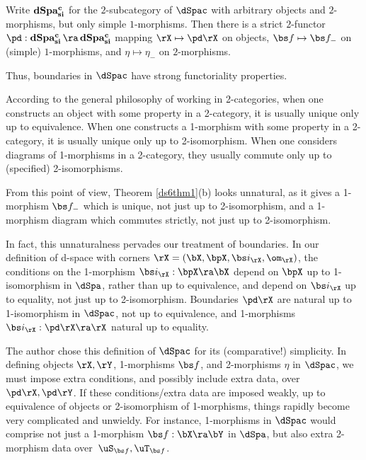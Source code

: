 \documentclass{article}
\begin{document}
\begin{cor} Write $\mathop{\bf dSpa^c_{si}}$ for the
$2$-subcategory of\/ $\dSpac$ with arbitrary objects and\/
$2$-morphisms, but only simple $1$-morphisms. Then there is a
strict\/ $2$-functor\/ $\pd:\mathop{\bf dSpa^c_{si}}\ra \mathop{\bf
dSpa^c_{si}}$ mapping $\rX\mapsto\pd\rX$ on objects, $\bs
f\mapsto\bs f_-$ on (simple)\/ $1$-morphisms, and\/
$\eta\mapsto\eta_-$ on $2$-morphisms.
\label{ds6cor}
\end{cor}

Thus, boundaries in $\dSpac$ have strong functoriality properties.

\begin{rem} According to the general philosophy of working in
2-categories, when one constructs an object with some property in a
2-category, it is usually unique only up to equivalence. When one
constructs a 1-morphism with some property in a 2-category, it is
usually unique only up to 2-isomorphism. When one considers diagrams
of 1-morphisms in a 2-category, they usually commute only up to
(specified) 2-isomorphisms.

From this point of view, Theorem \ref{ds6thm1}(b) looks unnatural,
as it gives a 1-morphism $\bs f_-$ which is unique, not just up to
2-isomorphism, and a 1-morphism diagram  which commutes
strictly, not just up to 2-isomorphism.

In fact, this unnaturalness pervades our treatment of boundaries. In
our definition of d-space with corners $\rX=(\bX,\bpX,\bs
i_\rX,\om_\rX)$, the conditions on the 1-morphism $\bs
i_\rX:\bpX\ra\bX$ depend on $\bpX$ up to 1-isomorphism in $\dSpa$,
rather than up to equivalence, and depend on $\bs i_\rX$ up to
equality, not just up to 2-isomorphism. Boundaries $\pd\rX$ are
natural up to 1-isomorphism in $\dSpac$, not up to equivalence, and
1-morphisms $\bs i_\rX:\pd\rX\ra\rX$ natural up to equality.

The author chose this definition of $\dSpac$ for its (comparative!)
simplicity. In defining objects $\rX,\rY$, 1-morphisms $\bs f$, and
2-morphisms $\eta$ in $\dSpac$, we must impose extra conditions, and
possibly include extra data, over $\pd\rX,\pd\rY$. If these
conditions/extra data are imposed weakly, up to equivalence of
objects or 2-isomorphism of 1-morphisms, things rapidly become very
complicated and unwieldy. For instance, 1-morphisms in $\dSpac$
would comprise not just a 1-morphism $\bs f:\bX\ra\bY$ in $\dSpa$,
but also extra 2-morphism data over~$\uS_{\bs f},\uT_{\bs f}$.


\end{rem}
\end{document}
